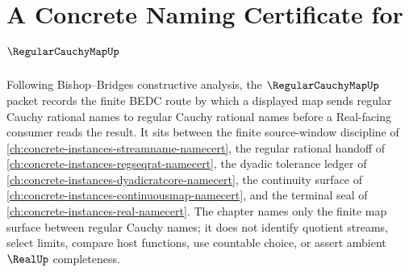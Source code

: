 \chapter{A Concrete Naming Certificate for $\RegularCauchyMapUp$}
\label{ch:concrete-instances-regular-cauchy-map-namecert}

Following Bishop--Bridges constructive analysis, the $\RegularCauchyMapUp$ packet records the finite BEDC route by which a displayed map sends regular Cauchy rational names to regular Cauchy rational names before a Real-facing consumer reads the result. It sits between the finite source-window discipline of \autoref{ch:concrete-instances-streamname-namecert}, the regular rational handoff of \autoref{ch:concrete-instances-regseqrat-namecert}, the dyadic tolerance ledger of \autoref{ch:concrete-instances-dyadicratcore-namecert}, the continuity surface of \autoref{ch:concrete-instances-continuousmap-namecert}, and the terminal seal of \autoref{ch:concrete-instances-real-namecert}. The chapter names only the finite map surface between regular Cauchy names; it does not identify quotient streams, select limits, compare host functions, use countable choice, or assert ambient $\RealUp$ completeness.

